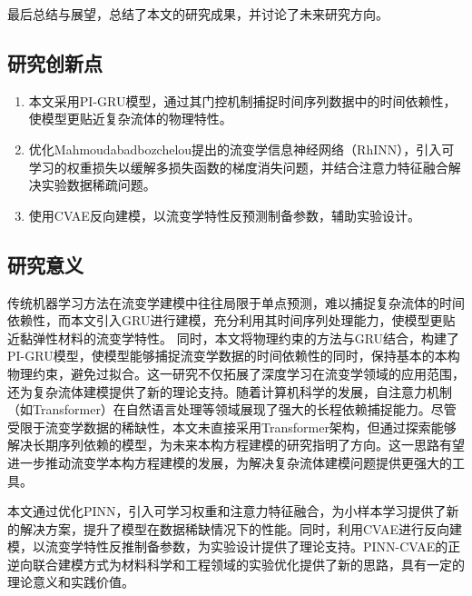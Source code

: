 最后总结与展望，总结了本文的研究成果，并讨论了未来研究方向。
\subsection{研究创新点}
\begin{enumerate}[topsep = 0 pt, itemsep= 0 pt, parsep=0pt, partopsep=0pt, leftmargin=44pt, itemindent=0pt, labelsep=6pt, label=(\arabic*)]
  \item 本文采用PI-GRU模型，通过其门控机制捕捉时间序列数据中的时间依赖性，使模型更贴近复杂流体的物理特性。
  \item 优化Mahmoudabadbozchelou提出的流变学信息神经网络（RhINN），引入可学习的权重损失以缓解多损失函数的梯度消失问题，并结合注意力特征融合解决实验数据稀疏问题。
  \item 使用CVAE反向建模，以流变学特性反预测制备参数，辅助实验设计。
\end{enumerate}
\subsection{研究意义}
传统机器学习方法在流变学建模中往往局限于单点预测，难以捕捉复杂流体的时间依赖性，而本文引入GRU进行建模，充分利用其时间序列处理能力，使模型更贴近黏弹性材料的流变学特性。
同时，本文将物理约束的方法与GRU结合，构建了PI-GRU模型，使模型能够捕捉流变学数据的时间依赖性的同时，保持基本的本构物理约束，避免过拟合。这一研究不仅拓展了深度学习在流变学领域的应用范围，还为复杂流体建模提供了新的理论支持。随着计算机科学的发展，自注意力机制（如Transformer）在自然语言处理等领域展现了强大的长程依赖捕捉能力。尽管受限于流变学数据的稀缺性，本文未直接采用Transformer架构，但通过探索能够解决长期序列依赖的模型，为未来本构方程建模的研究指明了方向。这一思路有望进一步推动流变学本构方程建模的发展，为解决复杂流体建模问题提供更强大的工具。

本文通过优化PINN，引入可学习权重和注意力特征融合，为小样本学习提供了新的解决方案，提升了模型在数据稀缺情况下的性能。同时，利用CVAE进行反向建模，以流变学特性反推制备参数，为实验设计提供了理论支持。PINN-CVAE的正逆向联合建模方式为材料科学和工程领域的实验优化提供了新的思路，具有一定的理论意义和实践价值。